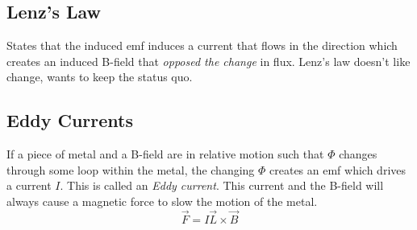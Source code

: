 \documentclass[10pt,letterpaper]{article}
\begin{document}
	\subsection*{Lenz's Law}
	States that the induced emf induces a current that flows in the direction which creates an induced B-field that \textit{opposed the change} in flux. Lenz's law doesn't like change, wants to keep the status quo. 
	
	\subsection*{Eddy Currents}
	If a piece of metal and a B-field are in relative motion such that $\Phi$ changes through some loop within the metal, the changing $\Phi$ creates an emf which drives a current $I$. This is called an \textit{Eddy current}.  This current and the B-field will always cause a magnetic force to slow the motion of the metal. 
	$$\vec{F} = I\vec{L} \times \vec{B}$$
	
	
	
\end{document}
